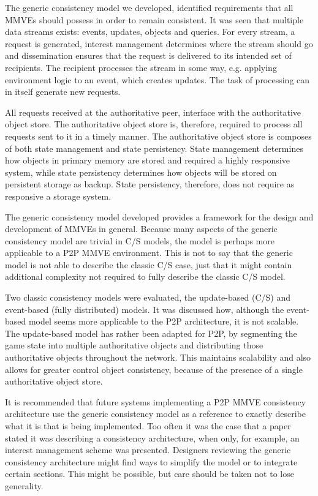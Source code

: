 The generic consistency model we developed, identified requirements that all MMVEs should possess in order to remain consistent. It was seen that multiple data streams exists: events, updates, objects and queries. For every stream, a request is generated, interest management determines where the stream should go and dissemination ensures that the request is delivered to its intended set of recipients. The recipient processes the stream in some way, e.g. applying environment logic to an event, which creates updates. The task of processing can in itself generate new requests.

All requests received at the authoritative peer, interface with the authoritative object store. The authoritative object store is, therefore, required to process all requests sent to it in a timely manner. The authoritative object store is composes of both state management and state persistency. State management determines how objects in primary memory are stored and required a highly responsive system, while state persistency determines how objects will be stored on persistent storage as backup. State persistency, therefore, does not require as responsive a storage system.

The generic consistency model developed provides a framework for the design and development of MMVEs in general. Because many aspects of the generic consistency model are trivial in C/S models, the model is perhaps more applicable to a P2P MMVE environment. This is not to say that the generic model is not able to describe the classic C/S case, just that it might contain additional complexity not required to fully describe the classic C/S model.

Two classic consistency models were evaluated, the update-based (C/S) and event-based (fully distributed) models. It was discussed how, although the event-based model seems more applicable to the P2P architecture, it is not scalable. The update-based model has rather been adapted for P2P, by segmenting the game state into multiple authoritative objects and distributing those authoritative objects throughout the network. This maintains scalability and also allows for greater control object consistency, because of the presence of a single authoritative object store.

It is recommended that future systems implementing a P2P MMVE consistency architecture use the generic consistency model as a reference to exactly describe what it is that is being implemented. Too often it was the case that a paper stated it was describing a consistency architecture, when only, for example, an interest management scheme was presented. Designers reviewing the generic consistency architecture might find ways to simplify the model or to integrate certain sections. This might be possible, but care should be taken not to lose generality.

